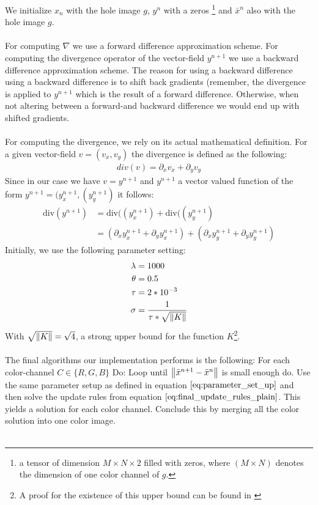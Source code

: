 We initialize $x_n$ with the hole image $g$, $y^{n}$ with a zeros \footnote{a tensor of dimension $M \times N \times 2$ filled with zeros, where $(M \times N)$ denotes the dimension of one color channel of $g$.} and $\bar{x}^{n}$ also with the hole image $g$. \\ \\
For computing $\nabla$ we use a forward difference approximation scheme. For computing the divergence operator of the vector-field $y^{n+1}$ we use a backward difference approximation scheme. The reason for using a backward difference using a backward difference is to shift back gradients (remember, the divergence is applied to $y^{n+1}$ which is the result of a forward difference. Otherwise, when not altering between a forward-and backward difference we would end up with shifted gradients. \\ \\
For computing the divergence, we rely on its actual mathematical definition. For a given vector-field $v = (v_x, v_y)$ the divergence is defined as the following:
\begin{align}
	div(v) = \partial_x v_x + \partial_y v_y
\end{align}
Since in our case we have $v = y^{n+1}$ and $y^{n+1}$ a vector valued function of the form $y^{n+1} = (y_{x}^{n+1}, (y_{y}^{n+1})$ it follows:
\begin{align}
	\text{div}(y^{n+1}) 
	&= \text{div}((y_{x}^{n+1}) + \text{div}((y_{y}^{n+1}) \\
	&= \left( \partial_x y_{x}^{n+1} + \partial_y y_{x}^{n+1} \right) + \left( \partial_x y_{y}^{n+1} + \partial_y y_{y}^{n+1} \right)
\end{align}
Initially, we use the following parameter setting:
\begin{equation}
\begin{aligned}
\lambda &= 1000 \\
\theta &= 0.5 \\
\tau &= 2*10^{-3} \\
\sigma &= \frac{1}{\tau * \sqrt{\left\lVert K\right\rVert}}
\end{aligned}
\label{eq:parameter_set_up}	
\end{equation}
With $\sqrt{\left\lVert K\right\rVert} = \sqrt{4}$, a strong upper bound for the function $K$\footnote{A proof for the existence of this upper bound can be found in \cite{chambolle2004algorithm}}. \\ \\
The final algorithms our implementation performs is the following: For each color-channel $C \in \{R,G,B\}$ Do: Loop until $\left\lVert\bar{x}^{n+1} - \bar{x}^{n}\right\rVert$ is small enough do. Use the same parameter setup as defined in equation $\ref{eq:parameter_set_up}$ and then solve the update rules from equation $\ref{eq:final_update_rules_plain}$. This yields a solution for each color channel. Conclude this by merging all the color solution into one color image. \\ \\
